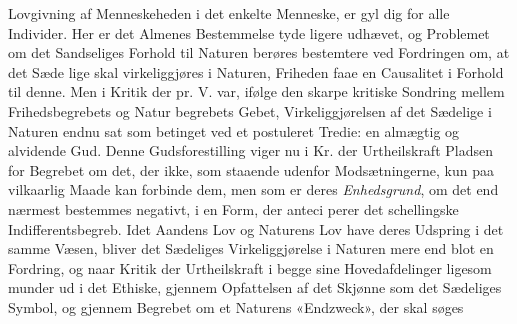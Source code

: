 \documentclass[12pt,a4paper]{book}
\begin{document}
Lovgivning af Menneskeheden i det enkelte Menneske, er gyl\-%
dig for alle Individer. Her er det Almenes Bestemmelse tyde\-%
ligere udhævet, og Problemet om det Sandseliges Forhold til
Naturen berøres bestemtere ved Fordringen om, at det Sæde\-%
lige skal virkeliggjøres i Naturen, Friheden faae en Causalitet
i Forhold til denne. Men i Kritik der pr. V. var, ifølge den
skarpe kritiske Sondring mellem Frihedsbegrebets og Natur\-%
begrebets Gebet, Virkeliggjørelsen af det Sædelige i Naturen
endnu sat som betinget ved et postuleret Tredie: en almægtig
og alvidende Gud. Denne Gudsforestilling viger nu i Kr. der
Urtheilskraft Pladsen for Begrebet om det, der ikke, som
staaende udenfor Modsætningerne, kun paa vilkaarlig Maade
kan forbinde dem, men som er deres \emph{Enhedsgrund}, om
det end nærmest bestemmes negativt, i en Form, der anteci\-%
perer det schellingske Indifferentsbegreb. Idet Aandens Lov
og Naturens Lov have deres Udspring i det samme Væsen,
bliver det Sædeliges Virkeliggjørelse i Naturen mere end blot
en Fordring, og naar Kritik der Urtheilskraft i begge sine
Hovedafdelinger ligesom munder ud i det Ethiske, gjennem
Opfattelsen af det Skjønne som det Sædeliges Symbol, og
gjennem Begrebet om et Naturens «Endzweck», der skal søges
\end{document}
